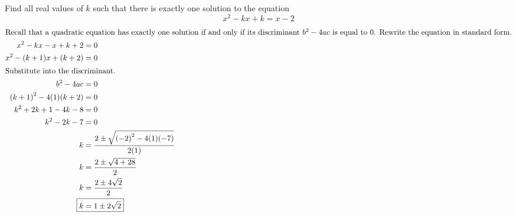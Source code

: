 


\section{}
	Find all real values of $k$ such that there is exactly one solution to the equation
	\[x^2 - kx + k = x - 2\]
	\begin{align*}
		\intertext{Recall that a quadratic equation has exactly one solution if and only if
		its discriminant $b^2 - 4ac$ is equal to $0$. Rewrite the equation in standard form.}
		x^2 - kx - x + k + 2 &= 0 \\
		x^2 - (k + 1)x + (k + 2) &= 0 \\
		\intertext{Substitute into the discriminant.}
		b^2 - 4ac &= 0 \\
		{(k + 1)}^2 - 4(1)(k + 2) &= 0 \\
		k^2 + 2k + 1 - 4k - 8 &= 0 \\
		k^2 - 2k - 7 &= 0 \\
		k &= \frac{2 \pm \sqrt{{(-2)}^2 - 4(1)(-7)}}{2(1)} \\
		k &= \frac{2 \pm \sqrt{4 + 28}}{2} \\
		k &= \frac{2 \pm 4\sqrt{2}}{2} \\
		\Aboxed{k &= 1 \pm 2\sqrt{2}} \\
	\end{align*}
